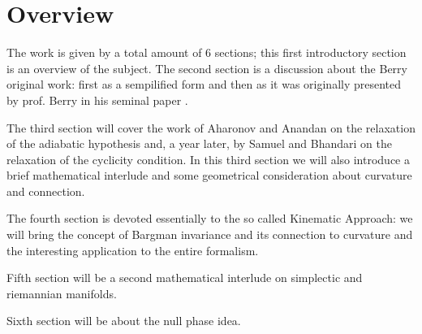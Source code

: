 
\chapter{Overview}

The work is given by a total amount of 6 sections; this first introductory section is an overview of the subject. The second section is a discussion about the Berry original work: first as a sempilified form and then as it was originally presented by prof. Berry in his seminal paper \cite{berry1985classical}. 

The third section will cover the work of Aharonov and Anandan\cite{aharonov1987phase} on the relaxation of the adiabatic hypothesis and, a year later, by Samuel and Bhandari \cite{samuel1988general} on the relaxation of the cyclicity condition. In this third section we will also introduce a brief mathematical interlude and some geometrical consideration about curvature and connection. 

The fourth section is devoted essentially to the so called Kinematic Approach: we will bring the concept of Bargman invariance and its connection to curvature and the interesting application to the entire formalism. 

Fifth section will be a second mathematical interlude on simplectic and riemannian manifolds. 

Sixth section will be about the null phase idea.

